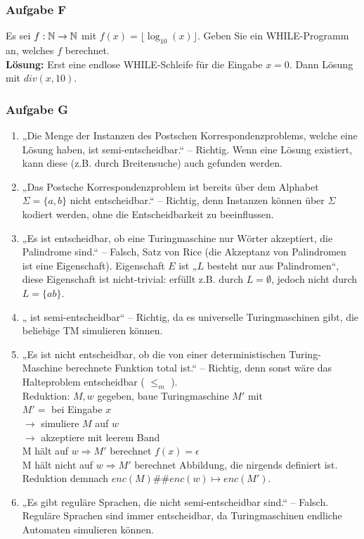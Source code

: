 \subsubsection*{Aufgabe F}
    Es sei $f:\mathbb{N}\to\mathbb{N}$ mit $f(x)=\lfloor\log_{10}(x)\rfloor$. Geben Sie ein WHILE-Programm an, welches $f$ berechnet. \\
    \textbf{Lösung:} Erst eine endlose WHILE-Schleife für die Eingabe $x=0$. Dann Lösung mit $div(x, 10)$.

\subsubsection*{Aufgabe G}
    \begin{enumerate}
        \item „Die Menge der Instanzen des Postschen Korrespondenzproblems, welche eine Lösung haben, ist semi-entscheidbar.“ – Richtig. Wenn eine Lösung existiert, kann diese (z.B. durch Breitensuche) auch gefunden werden.

        \item „Das Postsche Korrespondenzproblem ist bereits über dem Alphabet $\Sigma = \{a,b\}$ nicht entscheidbar.“ – Richtig, denn Instanzen können über $\Sigma$ kodiert werden, ohne die Entscheidbarkeit zu beeinflussen.

        \item „Es ist entscheidbar, ob eine Turingmaschine nur Wörter akzeptiert, die Palindrome sind.“ – Falsch, Satz von Rice (die Akzeptanz von Palindromen ist eine \f{Eigenschaft}). Eigenschaft $E$ ist „$L$ besteht nur aus Palindromen“, diese Eigenschaft ist nicht-trivial: erfüllt z.B. durch $L = \emptyset$, jedoch nicht durch $L = \{ab\}$.

        \item „ ist semi-entscheidbar“ – Richtig, da es universelle Turingmaschinen gibt, die beliebige TM simulieren können.

        \item „Es ist nicht entscheidbar, ob die von einer deterministischen Turing-Maschine berechnete Funktion total ist.“ – Richtig, denn sonst wäre das Halteproblem entscheidbar ( $\leq_m$ ). \\
        Reduktion: $M, w$ gegeben, baue Turingmaschine $M'$ mit \\
        $M' =$ bei Eingabe $x$ \\
        $\to$ simuliere $M$ auf $w$ \\
        $\to$ akzeptiere mit leerem Band \\
        M hält auf $w \Rightarrow M'$ berechnet $f(x)= \epsilon$ \\
        M hält nicht auf $w \Rightarrow M'$ berechnet Abbildung, die nirgends definiert ist. \\
        Reduktion demnach $enc(M)\#\#enc(w) \mapsto enc(M')$.

        \item „Es gibt reguläre Sprachen, die nicht semi-entscheidbar sind.“ – Falsch. Reguläre Sprachen sind immer entscheidbar, da Turingmaschinen endliche Automaten simulieren können.
    \end{enumerate}

